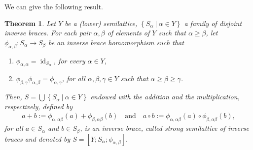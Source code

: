 \documentclass[preprint,1p]{elsarticle}
\newtheorem{theor}{Theorem}[section]
\theoremstyle{definition}               %
\DeclareMathOperator{\id}{id}
\newcommand{\phii}[2]{\phi_{#1,#2}}
\begin{document}
We can give the following result.
\begin{theor}\label{teo_semila}
Let $Y$ be a (lower) semilattice, $\left\{S_{\alpha}\ \left|\ \alpha \in Y\right.\right\}$ a family of disjoint inverse braces. For each pair $\alpha,\beta$ of elements of $Y$ such that $\alpha \geq \beta$, let $\phii{\alpha}{\beta}:S_{\alpha}\to S_{\beta}$ be an inverse brace homomorphism such that
\begin{enumerate}
    \item $\phii{\alpha}{\alpha}=\id_{S_{\alpha}}$, for every $\alpha \in Y$,
    \item $\phii{\beta}{\gamma}{}\phii{\alpha}{\beta}{} = \phii{\alpha}{\gamma}{}$, for all $\alpha, \beta, \gamma \in Y$ such that $\alpha \geq \beta \geq \gamma$.
\end{enumerate}
Then, $S = \bigcup\left\{S_{\alpha}\ \left|\ \alpha\in Y\right.\right\}$ endowed with the addition and the multiplication, respectively, defined by
\begin{align*}
    a+b:= \phii{\alpha}{\alpha\beta}(a)+\phii{\beta}{\alpha\beta}(b)
    \quad\text{and}\quad
     a\circ b:= \phii{\alpha}{\alpha\beta}(a)\circ\phii{\beta}{\alpha\beta}(b),
\end{align*}
for all $a\in S_{\alpha}$ and $b\in S_{\beta}$, is an inverse brace, called \emph{strong semilattice of inverse braces} and
denoted by $S=[Y; S_\alpha;\phii{\alpha}{\beta}]$. \end{theor}
\end{document}
